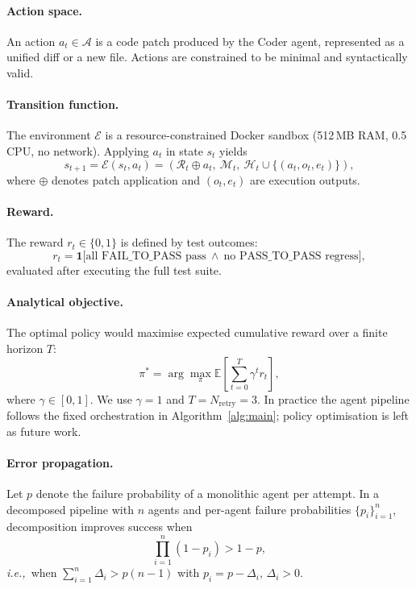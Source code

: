 \documentclass[journal]{IEEEtran}
\newcommand{\ie}{\textit{i.e.,}\ }
\begin{document}
\paragraph{Action space.}
An action $a_t \in \mathcal{A}$ is a code patch produced by the Coder agent, represented as a unified diff or a new file. Actions are constrained to be minimal and syntactically valid.

\paragraph{Transition function.}
The environment $\mathcal{E}$ is a resource-constrained Docker sandbox (512\,MB RAM, 0.5 CPU, no network). Applying $a_t$ in state $s_t$ yields
\begin{equation}
    s_{t+1} = \mathcal{E}(s_t, a_t) = (\mathcal{R}_t \oplus a_t,\ \mathcal{M}_t,\ \mathcal{H}_t \cup \{(a_t, o_t, e_t)\}),
\end{equation}
where $\oplus$ denotes patch application and $(o_t, e_t)$ are execution outputs.

\paragraph{Reward.}
The reward $r_t \in \{0,1\}$ is defined by test outcomes:
\begin{equation}
r_t = \mathbf{1}\big[\text{all FAIL\_TO\_PASS pass} \ \wedge\ \text{no PASS\_TO\_PASS regress}\big],
\end{equation}
evaluated after executing the full test suite.

\paragraph{Analytical objective.}
The optimal policy would maximise expected cumulative reward over a finite horizon $T$:
\begin{equation}
\pi^* = \arg\max_{\pi} \mathbb{E}\left[\sum_{t=0}^{T} \gamma^t r_t \right],
\end{equation}
where $\gamma \in [0,1]$. We use $\gamma = 1$ and $T = N_{\text{retry}} = 3$. In practice the agent pipeline follows the fixed orchestration in Algorithm~\ref{alg:main}; policy optimisation is left as future work.

\paragraph{Error propagation.}
Let $p$ denote the failure probability of a monolithic agent per attempt. In a decomposed pipeline with $n$ agents and per-agent failure probabilities $\{p_i\}_{i=1}^n$, decomposition improves success when
\begin{equation}
\prod_{i=1}^{n} (1 - p_i) > 1 - p,
\end{equation}
\ie when $\sum_{i=1}^{n} \Delta_i > p(n-1)$ with $p_i = p - \Delta_i$, $\Delta_i > 0$.
\end{document}
